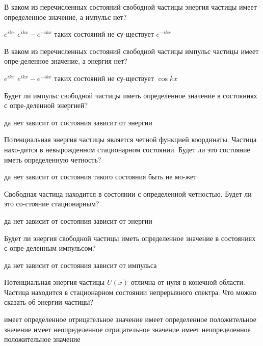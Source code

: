 \documentclass[11pt,a4paper]{exam}
\begin{document}
\begin{questions}
\question В каком из перечисленных состояний свободной частицы энергия частицы имеет определенное значение, а импульс нет?
\begin{choices}
\choice ${e^{ikx}}$       
\choice ${e^{ikx}} - {e^{ - ikx}}$    
\choice таких состояний не су-ществует      
\choice ${e^{ - ikx}}$
\end{choices}

\question В каком из перечисленных состояний свободной частицы импульс частицы имеет опре-деленное значение, а энергия нет?
\begin{choices}
\choice ${e^{ikx}}$       
\choice ${e^{ikx}} - {e^{ - ikx}}$    
\choice таких состояний не су-ществует      
\choice $\cos kx$
\end{choices}

\question Будет ли импульс свободной частицы иметь определенное значение в состояниях с опре-деленной энергией? 
\begin{choices}
\choice да    
\choice нет      
\choice зависит от состояния    
\choice зависит от энергии
\end{choices}

\question Потенциальная энергия частицы является четной функцией координаты. Частица нахо-дится в невырожденном стационарном состоянии. Будет ли это состояние иметь определенную четность?
\begin{choices}
\choice да    
\choice нет      
\choice зависит от состояния    
\choice такого состояния быть не мо-жет
\end{choices}

\question Свободная частица находится в состоянии с определенной четностью. Будет ли это со-стояние стационарным? 
\begin{choices}
\choice да    
\choice нет      
\choice зависит от состояния    
\choice зависит от энергии
\end{choices}

\question Будет ли энергия свободной частицы иметь определенное значение в состояниях с опре-деленным импульсом? 
\begin{choices}
\choice да    
\choice нет      
\choice зависит от состояния    
\choice зависит от импульса
\end{choices}

\question Потенциальная энергия частицы $U(x)$ отлична от нуля в конечной области. Частица находится в стационарном состоянии непрерывного спектра. Что можно сказать об энергии частицы?
\begin{choices}
\choice имеет определенное отрицательное значение
\choice имеет определенное положительное значение
\choice имеет неопределенное отрицательное значение
\choice имеет неопределенное положительное значение
\end{choices}


\end{questions}
\end{document}
